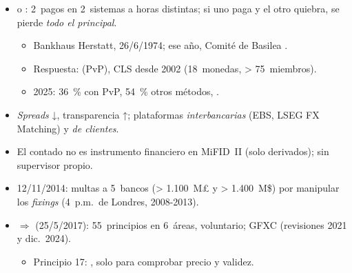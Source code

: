 \documentclass{article}
\begin{document}
\begin{columnas}
\begin{itemize}
  \begin{itemize}
  \item EMIR: ESMA no impuso compensar NDF (2015); Dodd-Frank (2010): el Tesoro (nov.\ 2012) excluye FX \emph{swaps} y \emph{forwards} con entrega .
  \end{itemize}
\item {} o : 2~pagos en 2~sistemas a horas distintas; si uno paga y el otro quiebra, se pierde \emph{todo el principal}.
  \begin{itemize}
  \item Bankhaus Herstatt, 26/6/1974; ese año, Comité de Basilea .
  \item Respuesta:  (PvP), CLS desde 2002 (18~monedas, > 75~miembros).
  \item 2025: 36~\% con PvP, 54~\% otros métodos, .
  \end{itemize}
\end{itemize}
\begin{itemize}
\item \emph{Spreads} ↓, transparencia ↑; plataformas \emph{interbancarias} (EBS, LSEG FX Matching) y \emph{de clientes}.
\end{itemize}
\begin{itemize}
\item El contado no es instrumento financiero en MiFID~II (solo derivados); sin supervisor propio.
\item 12/11/2014: multas a 5~bancos (> 1.100~M£ y > 1.400~M\$) por manipular los \emph{fixings} (4~p.m.\ de Londres, 2008-2013).
\item $\Rightarrow$  (25/5/2017): 55~principios en 6~áreas, voluntario; GFXC (revisiones 2021 y dic.\ 2024).
  \begin{itemize}
  \item Principio 17: , solo para comprobar precio y validez.
  \end{itemize}
\end{itemize}


\end{columnas}
\end{document}
